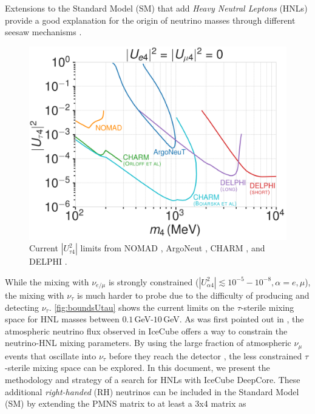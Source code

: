 Extensions to the Standard Model (SM) that add \textit{Heavy Neutral Leptons} (HNLs) provide a good explanation for the origin of neutrino masses through different seesaw mechanisms \cite{PTP.64.1103}.
\begin{figure}
  \includegraphics{figures/hnl_simulation/theory/UtauN_custom_plots_LF_grid_white.png}
  \caption{Current $|U_{\tau4}^2|$ limits from NOMAD \cite{NOMAD:2001eyx}, ArgoNeut \cite{ArgoNeuT:2021clc}, CHARM \cite{Orloff:2002de, Boiarska:2021yho}, and DELPHI \cite{DELPHI:1996qcc}.}
\end{figure}
While the mixing with $\nu_{e/\mu}$ is strongly constrained ($|U_{\alpha4}^2| \lesssim 10^{-5}-10^{-8}, \alpha=e,\mu$), the mixing with $\nu_{\tau}$ is much harder to probe due to the difficulty of producing and detecting $\nu_\tau$. \cref{fig:boundsUtau} shows the current limits on the $\tau$-sterile mixing space for HNL masses between $0.1$\,GeV-$10$\,GeV. As was first pointed out in \cite{Coloma_2017}, the atmospheric neutrino flux observed in IceCube offers a way to constrain the neutrino-HNL mixing parameters. By using the large fraction of atmospheric $\nu_{\mu}$ events that oscillate into $\nu_{\tau}$ before they reach the detector \cite{IceCube:2019dqi}, the less constrained $\tau$-sterile mixing space can be explored. In this document, we present the methodology and strategy of a search for HNLs with IceCube DeepCore. These additional \textit{right-handed} (RH) neutrinos can be included in the Standard Model (SM) by extending the PMNS matrix to at least a 3x4 matrix as
